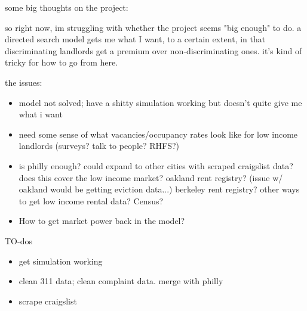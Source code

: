 some big thoughts on the project:

so right now, im struggling with whether the project seems "big enough" to do. a directed search model gets me what I want, to a certain extent, in that discriminating landlords get a premium over non-discriminating ones. it's kind of tricky for how to go from here.

the issues:

\begin{itemize}
    \item model not solved; have a shitty simulation working but doesn't quite give me what i want 
    \item need some sense of what vacancies/occupancy rates look like for low income landlords (surveys? talk to people? RHFS?)
    \item is philly enough? could expand to other cities with scraped craigslist data? does this cover the low income market? oakland rent registry? (issue w/ oakland would be getting eviction data...) berkeley rent registry? other ways to get low income rental data? Census?
    \item How to get market power back in the model?
\end{itemize}

TO-dos
\begin{itemize}
    \item get simulation working
    \item clean 311 data; clean complaint data. merge with philly
    \item scrape craigslist
\end{itemize}





